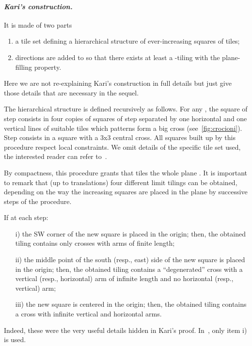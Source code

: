 \documentclass{llncs}
\begin{document}
\paragraph{\emph{Kari's construction.}} It is made of two parts
\begin{enumerate}
\item a tile set  defining a hierarchical structure of ever-increasing squares of tiles;
\item directions are added to  so that
there exists at least a -tiling with the plane-filling property.
\end{enumerate}
\smallskip

Here we are not re-explaining Kari's construction in full details but just
give those details that are necessary in the sequel.
\smallskip

\noindent\quad The hierarchical structure is defined recursively as follows.
For any , the square of step  consists in four copies
of squares of step  separated by one horizontal and one vertical lines of suitable tiles which patterns form a big cross (see~\ref{fig:crocioni}).
Step  consists in a square with a 3x3 central cross. All squares built up by this procedure respect local constraints. We omit details of
the specific tile set used, the interested reader can refer 
to~\cite{kari94a}. 

By compactness, this procedure grants that  tiles the whole
plane . It is important to remark that (up to
translations) four different limit tilings can be obtained, depending on
the way the increasing squares are placed in the plane by
successive steps of the procedure.  

If at each step:
\begin{enumerate}
\item[i)] the SW corner of the new square is placed in the origin; then,
the obtained tiling contains only crosses with arms of finite length;
\item[ii)] the middle point of the south (resp., east) side of the new square is placed  in the origin; then, the obtained tiling contains a ``degenerated'' cross with a vertical (resp., horizontal) arm of infinite length and no horizontal (resp., vertical) arm;
\item[iii)] the new square is centered in the origin; then, the obtained tiling contains a cross with infinite vertical and horizontal arms. 
\end{enumerate}

Indeed, these were the very useful details hidden in Kari's proof.
In~\cite{kari94a}, only item i) is used.
\medskip
\end{document}
